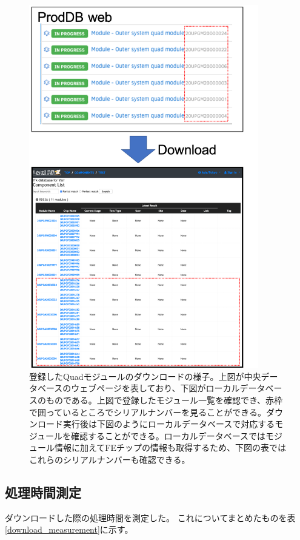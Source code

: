 \begin{figure}[bpt]\centering
\includegraphics[width=10cm]{registerd_kek_module_viewer}
\caption[登録したQuadモジュールのダウンロードの様子]{登録したQuadモジュールのダウンロードの様子。上図が中央データベースのウェブページを表しており、下図がローカルデータベースのものである。上図で登録したモジュール一覧を確認でき、赤枠で囲っているところでシリアルナンバーを見ることができる。ダウンロード実行後は下図のようにローカルデータベースで対応するモジュールを確認することができる。ローカルデータベースではモジュール情報に加えてFEチップの情報も取得するため、下図の表ではこれらのシリアルナンバーも確認できる。}
\label{registered_kek_module_viewer}
\end{figure}

\subsection{処理時間測定}
ダウンロードした際の処理時間を測定した。
これについてまとめたものを表\ref{download_measurement}に示す。

